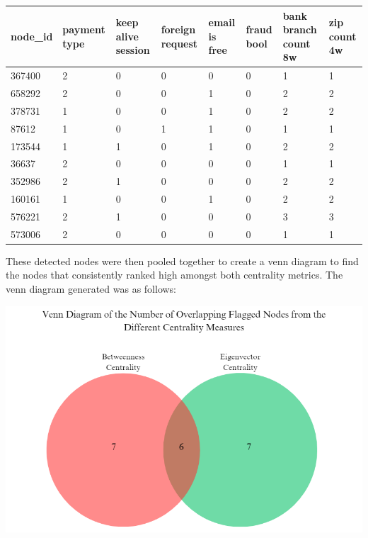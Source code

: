 \documentclass{styles/svproc}
\begin{document}
\noindent
\begin{tabular}{ | m{2cm} | m{1.5cm}| m{1.2cm}| m{1.2cm}| m{1.2cm}| m{1.1cm}| m{1.2cm}| m{1.1cm}|} 
  \hline
  \textbf{node\_id} & \textbf{payment type} & \textbf{keep alive session} & \textbf{foreign request} &  \textbf{email is free} & \textbf{fraud bool} & \textbf{bank branch count 8w} & \textbf{zip count 4w}\\ 
  \hline
   367400 & 2 & 0 & 0 & 0 & 0 & 1 & 1\\ 
  \hline
  658292 & 2 & 0 & 0 & 1 & 0 & 2 & 2\\ 
  \hline
  378731 & 1 & 0 & 0 & 1 & 0 & 2 & 2\\
  \hline
  87612 & 1 & 0 & 1 & 1 & 0 & 1 & 1\\
  \hline
  173544 & 1 & 1 & 0 & 1 & 0 & 2 & 2\\
  \hline
  36637 & 2 & 0 & 0 & 0 & 0 & 1 & 1\\
  \hline
  352986 & 2 & 1 & 0 & 0 & 0 & 2 & 2\\
  \hline
  160161 & 1 & 0 & 0 & 1 & 0 & 2 & 2\\
  \hline
  576221 & 2 & 1 & 0 & 0 & 0 & 3 & 3\\
  \hline
  573006 & 2 & 0 & 0 & 0 & 0 & 1 & 1\\
  \hline
\end{tabular}


\noindent These detected nodes were then pooled together to create a venn diagram to find the nodes that consistently ranked high amongst both centrality metrics. The venn diagram generated was as follows:

\includegraphics[scale=0.45]{venn}
\end{document}
